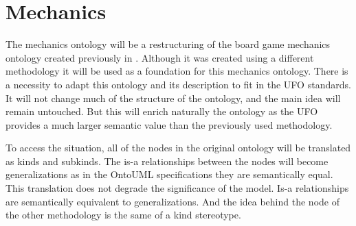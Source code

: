 \section{Mechanics}
The mechanics ontology will be a restructuring of the board game mechanics ontology created previously in \cite{kritz_buildingOntology}. Although it was created using a different methodology it will be used as a foundation for this mechanics ontology. There is a necessity to adapt this ontology and its description to fit in the UFO standards. It will not change much of the structure of the ontology, and the main idea will remain untouched. But this will enrich naturally the ontology as the UFO provides a much larger semantic value than the previously used methodology.

To access the situation, all of the nodes in the original ontology will be translated as kinds and subkinds. The is-a relationships between the nodes will become generalizations as in the OntoUML specifications they are semantically equal. This translation does not degrade the significance of the model. Is-a relationships are semantically equivalent to generalizations. And the idea behind the node of the other methodology is the same of a kind stereotype.
